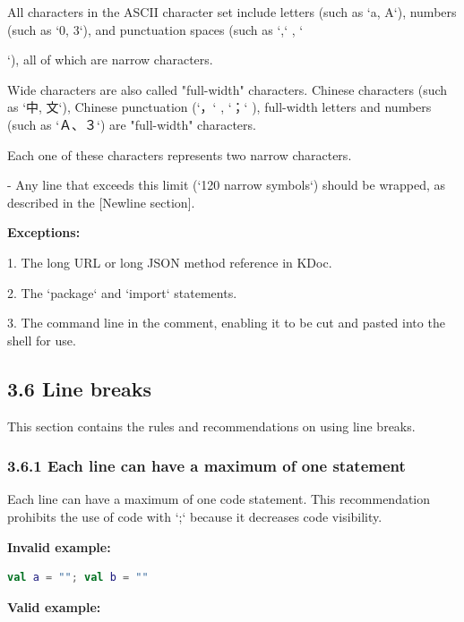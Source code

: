 All characters in the ASCII character set include letters (such as `a, A`), numbers (such as `0, 3`), and punctuation spaces (such as `,` , `{`), all of which are narrow characters.

Wide characters are also called "full-width" characters. Chinese characters (such as `中, 文`), Chinese punctuation (`，` , `；` ), full-width letters and numbers (such as `Ａ、３`) are "full-width" characters.

Each one of these characters represents two narrow characters.



- Any line that exceeds this limit (`120 narrow symbols`) should be wrapped, as described in the [Newline section]. 



\textbf{Exceptions:}



1.	The long URL or long JSON method reference in KDoc.

2.	The `package` and `import` statements.

3.	The command line in the comment, enabling it to be cut and pasted into the shell for use.



\subsection*{\textbf{3.6 Line breaks}}

\label{sec:3.6}

This section contains the rules and recommendations on using line breaks.

\subsubsection*{\textbf{3.6.1 Each line can have a maximum of one statement}}
\leavevmode\newline

\label{sec:3.6.1}

Each line can have a maximum of one code statement. This recommendation prohibits the use of code with `;` because it decreases code visibility.



\textbf{Invalid example:}

\begin{lstlisting}[language=Kotlin]
val a = ""; val b = ""
\end{lstlisting}


\textbf{Valid example:}

}
